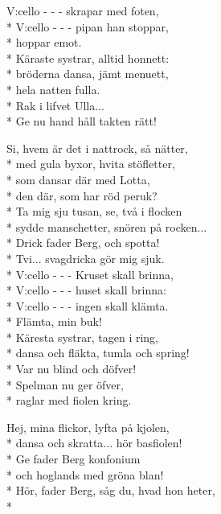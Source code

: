 \begin{SongText}
\begin{SongVerse}
        V:cello - - - skrapar med foten,\\*%
        V:cello - - - pipan han stoppar,\\*%
        hoppar emot.\\*%
        Käraste systrar, alltid honnett:\\*%
        bröderna dansa, jämt menuett,\\*%
        hela natten fulla.\\*%
        Rak i lifvet Ulla...\\*%
        Ge nu hand håll takten rätt!
    \end{SongVerse}
    \begin{SongVerse}
        Si, hvem är det i nattrock, så nätter,\\*%
        med gula byxor, hvita stöfletter,\\*%
        som dansar där med Lotta,\\*%
        den där, som har röd peruk?\\*%
        Ta mig sju tusan, se, två i flocken\\*%
        sydde manschetter, snören på rocken...\\*%
        Drick fader Berg, och spotta!\\*%
        Tvi... svagdricka gör mig sjuk.\\*%
        V:cello - - - Kruset skall brinna,\\*%
        V:cello - - - huset skall brinna:\\*%
        V:cello - - - ingen skall klämta.\\*%
        Flämta, min buk!\\*%
        Käresta systrar, tagen i ring,\\*%
        dansa och fläkta, tumla och spring!\\*%
        Var nu blind och döfver!\\*%
        Spelman nu ger öfver,\\*%
        raglar med fiolen kring.
    \end{SongVerse}
    \begin{SongVerse}
        Hej, mina flickor, lyfta på kjolen,\\*%
        dansa och skratta... hör basfiolen!\\*%
        Ge fader Berg konfonium\\*%
        och hoglands med gröna blan!\\*%
        Hör, fader Berg, såg du, hvad hon heter,\\*%

\end{SongVerse}
\end{SongText}

